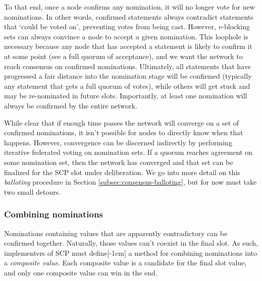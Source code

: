 To that end, once a node confirms any nomination, it will no longer vote for new nominations. In other words, confirmed statements always contradict statements that `could be voted on', preventing votes from being cast. However, $v$-blocking sets can always convince a node to accept a given nomination. This loophole is necessary because any node that has accepted a statement is likely to confirm it at some point (see a full quorum of acceptance), and we want the network to reach consensus on confirmed nominations. Ultimately, all statements that have progressed a fair distance into the nomination stage will be confirmed (typically any statement that gets a full quorum of votes), while others will get stuck and may be re-nominated in future slots. Importantly, at least one nomination will always be confirmed by the entire network.

While clear that if enough time passes the network will converge on a set of confirmed nominations, it isn't possible for nodes to directly know when that happens. However, convergence can be discerned indirectly by performing iterative federated voting on nomination sets. If a quorum reaches agreement on some nomination set, then the network has converged and that set can be finalized for the SCP slot under deliberation. We go into more detail on this {\em balloting} procedure in Section \ref{subsec:consensus-balloting}, but for now must take two small detours.

\subsubsection{Combining nominations}

Nominations containing values that are apparently contradictory can be confirmed together. Naturally, those values can't coexist in the final slot. As such, implementers of SCP must define[-1cm] a method for combining nominations into a {\em composite value}. Each composite value is a candidate for the final slot value, and only one composite value can win in the end.

